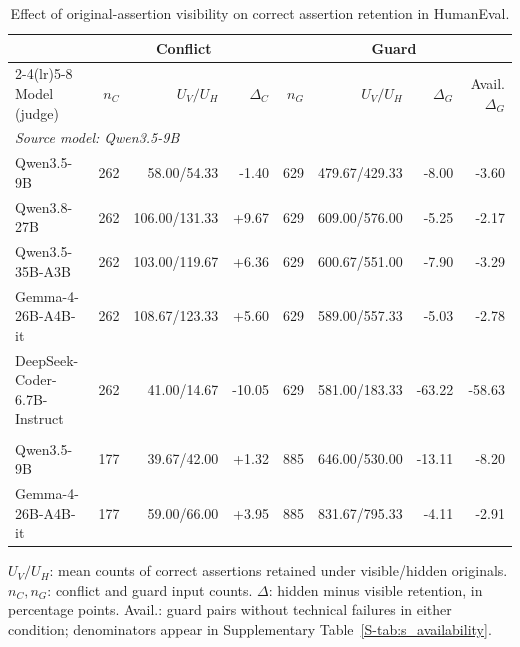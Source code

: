 \begin{table}[t]
\centering
\small
\caption{Effect of original-assertion visibility on correct assertion retention in HumanEval.}
\label{tab:visibility}
\begin{tabular}{lrrrrrrr}
\toprule
& \multicolumn{3}{c}{Conflict} & \multicolumn{4}{c}{Guard} \\
\cmidrule(lr){2-4}\cmidrule(lr){5-8}
Model (judge) & $n_C$ & $U_V/U_H$ & $\Delta_C$ & $n_G$ & $U_V/U_H$ & $\Delta_G$ & Avail. $\Delta_G$ \\
\midrule
\multicolumn{8}{l}{\textit{Source model: Qwen3.5-9B}} \\
Qwen3.5-9B & 262 & 58.00/54.33 & -1.40 & 629 & 479.67/429.33 & -8.00 & -3.60 \\
Qwen3.8-27B & 262 & 106.00/131.33 & +9.67 & 629 & 609.00/576.00 & -5.25 & -2.17 \\
Qwen3.5-35B-A3B & 262 & 103.00/119.67 & +6.36 & 629 & 600.67/551.00 & -7.90 & -3.29 \\
Gemma-4-26B-A4B-it & 262 & 108.67/123.33 & +5.60 & 629 & 589.00/557.33 & -5.03 & -2.78 \\
DeepSeek-Coder-6.7B-Instruct & 262 & 41.00/14.67 & -10.05 & 629 & 581.00/183.33 & -63.22 & -58.63 \\
\addlinespace
\multicolumn{8}{l}{\textit{Source model: Gemma-4-26B-A4B-it}} \\
Qwen3.5-9B & 177 & 39.67/42.00 & +1.32 & 885 & 646.00/530.00 & -13.11 & -8.20 \\
Gemma-4-26B-A4B-it & 177 & 59.00/66.00 & +3.95 & 885 & 831.67/795.33 & -4.11 & -2.91 \\
\bottomrule
\end{tabular}
\par\smallskip
\begin{minipage}{\linewidth}
\footnotesize
$U_V/U_H$: mean counts of correct assertions retained under visible/hidden originals. $n_C,n_G$: conflict and guard input counts. $\Delta$: hidden minus visible retention, in percentage points. Avail.: guard pairs without technical failures in either condition; denominators appear in Supplementary Table~\ref{S-tab:s_availability}.
\end{minipage}
\end{table}
